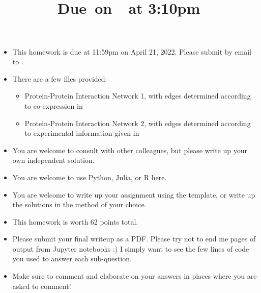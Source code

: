 \documentclass{article}
\title{
    \vspace{2in}
    \textmd{\textbf{\hmwkClass\hmwkTitle}}\\
    \normalsize\vspace{0.1in}\small{Due\ on\ \hmwkDueDate\ at 3:10pm}\\
    \vspace{3in}
}
\author{\hmwkAuthorName}
\date{}
\begin{document}

\begin{itemize}
\item This homework is due at 11:59pm on April 21, 2022. Please submit by email to . 
\item There are a few files provided:
\begin{itemize}
\item Protein-Protein Interaction Network 1, with edges determined according to co-expression in 
\item Protein-Protein Interaction Network 2, with edges determined according to experimental information given in 
\end{itemize}
\item You are welcome to consult with other colleagues, but please write up your own independent solution. 
\item You are welcome to use Python, Julia, or R here.
\item You are welcome to write up your assignment using the  template, or write up the solutions in the method of your choice. 
\item This homework is worth 62 points total. 
\item Please submit your final writeup as a PDF. Please try not to end me pages of output from Jupyter notebooks :) I simply want to see the few lines of code you used to answer each sub-question.
\item Make sure to comment and elaborate on your answers in places where you are asked to comment! 
\end{itemize}
\end{document}
